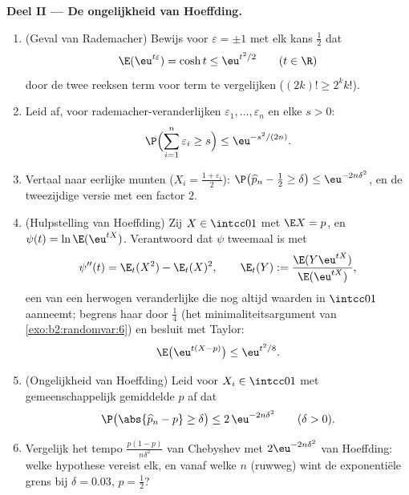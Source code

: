 \begin{problem}
\medskip
\noindent\textbf{Deel II --- De ongelijkheid van Hoeffding.}
\begin{enumerate}[resume]
  \item (Geval van Rademacher) Bewijs voor $\varepsilon = \pm1$ met
        elk kans $\frac12$ dat
        \[
        \E(\eu^{t\varepsilon}) = \cosh t \leq \eu^{t^2/2}
        \qquad (t \in \R)
        \]
        door de twee reeksen term voor term te vergelijken ($(2k)!
        \geq 2^kk!$).
  \item Leid af, voor  rademacher-veranderlijken
        $\varepsilon_1, \dots, \varepsilon_n$ en elke $s > 0$:
        \[
        \P\Bigl(\sum_{i=1}^n\varepsilon_i \geq s\Bigr)
        \leq \eu^{-s^2/(2n)} .
        \]
  \item Vertaal naar eerlijke munten ($X_i =
        \frac{1+\varepsilon_i}2$): $\P\bigl(\widehat p_n -
        \tfrac12 \geq \delta\bigr) \leq \eu^{-2n\delta^2}$, en de
        tweezijdige versie met een factor $2$.
  \item (Hulpstelling van Hoeffding) Zij $X \in \intcc01$ met $\E X
        = p$, en $\psi(t) = \ln\E(\eu^{tX})$. Verantwoord dat
        $\psi$ tweemaal  is met
        \[
        \psi''(t) = \E_t(X^2) - \E_t(X)^2, \qquad
        \E_t(Y) := \frac{\E(Y\eu^{tX})}{\E(\eu^{tX})},
        \]
        een \emph{} van een herwogen veranderlijke die nog
        altijd waarden in $\intcc01$ aanneemt; begrens haar door
        $\frac14$ (het minimaliteitsargument van
        \cref{exo:b2:randomvar:6}) en besluit met Taylor:
        \[
        \E\bigl(\eu^{t(X - p)}\bigr) \leq \eu^{t^2/8} .
        \]
  \item (Ongelijkheid van Hoeffding) Leid voor  $X_i
        \in \intcc01$ met gemeenschappelijk gemiddelde $p$ af dat
        \[
        \P\bigl(\abs{\widehat p_n - p} \geq \delta\bigr)
        \leq 2\,\eu^{-2n\delta^2}
        \qquad (\delta > 0).
        \]
  \item Vergelijk het tempo $\frac{p(1-p)}{n\delta^2}$ van
        Chebyshev met $2\eu^{-2n\delta^2}$ van Hoeffding: welke
        hypothese vereist elk, en vanaf welke $n$ (ruwweg) wint de
        exponentiële grens bij $\delta = 0.03$, $p = \frac12$?
\end{enumerate}


\end{problem}
